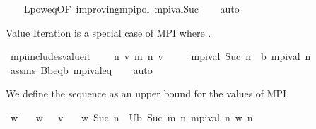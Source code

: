 \begin{isabellebody}
%
\isadelimproof
\ \ %
\endisadelimproof
%
\isatagproof
{}\isamarkupfalse%
\ L{\isacharunderscore}{\kern0pt}pow{\isacharunderscore}{\kern0pt}eq{\isacharbrackleft}{\kern0pt}OF\ {\isasymnu}{\isacharunderscore}{\kern0pt}improving{\isacharunderscore}{\kern0pt}mpi{\isacharunderscore}{\kern0pt}pol{\isacharbrackright}{\kern0pt}\ mpi{\isacharunderscore}{\kern0pt}val{\isacharunderscore}{\kern0pt}Suc\isanewline
\ \ \isamarkupfalse%
\ auto%
\endisatagproof
{\isafoldproof}%
%
\isadelimproof
%
\endisadelimproof
%
\begin{isamarkuptext}%
Value Iteration is a special case of MPI where .%
\end{isamarkuptext}\isamarkuptrue%
\isamarkupfalse%
\ mpi{\isacharunderscore}{\kern0pt}includes{\isacharunderscore}{\kern0pt}value{\isacharunderscore}{\kern0pt}it{\isacharcolon}{\kern0pt}\ \isanewline
\ \ \ {\isachardoublequoteopen}{\isasymforall}n\ v{\isachardot}{\kern0pt}\ m\ n\ v\ {\isacharequal}{\kern0pt}\ {}{\isachardoublequoteclose}\isanewline
\ \ \ {\isachardoublequoteopen}mpi{\isacharunderscore}{\kern0pt}val\ {\isacharparenleft}{\kern0pt}Suc\ n{\isacharparenright}{\kern0pt}\ {\isacharequal}{\kern0pt}\ {\isasymL}\isactrlsub b\ {\isacharparenleft}{\kern0pt}mpi{\isacharunderscore}{\kern0pt}val\ n{\isacharparenright}{\kern0pt}{\isachardoublequoteclose}\isanewline
%
\isadelimproof
\ \ %
\endisadelimproof
%
\isatagproof
{}\isamarkupfalse%
\ assms\ B\isactrlsub b{\isacharunderscore}{\kern0pt}eq{\isacharunderscore}{\kern0pt}{\isasymL}\isactrlsub b\ mpi{\isacharunderscore}{\kern0pt}val{\isacharunderscore}{\kern0pt}eq\isanewline
\ \ \isamarkupfalse%
\ auto%
\endisatagproof
{\isafoldproof}%
%
\isadelimproof
%
\endisadelimproof
%
\isadelimdocument
%
\endisadelimdocument
%
\isatagdocument
%
\isamarkuptrue%
%
\endisatagdocument
{\isafolddocument}%
%
\isadelimdocument
%
\endisadelimdocument
%
\begin{isamarkuptext}%
We define the sequence  as an upper bound for the values of MPI.%
\end{isamarkuptext}\isamarkuptrue%
\isamarkupfalse%
\ w\ \isanewline
\ \ {\isachardoublequoteopen}w\ {}\ {\isacharequal}{\kern0pt}\ v{}{\isachardoublequoteclose}\ {\isacharbar}{\kern0pt}\isanewline
\ \ {\isachardoublequoteopen}w\ {\isacharparenleft}{\kern0pt}Suc\ n{\isacharparenright}{\kern0pt}\ {\isacharequal}{\kern0pt}\ U\isactrlsub b\ {\isacharparenleft}{\kern0pt}Suc\ {\isacharparenleft}{\kern0pt}m\ n\ {\isacharparenleft}{\kern0pt}mpi{\isacharunderscore}{\kern0pt}val\ n{\isacharparenright}{\kern0pt}{\isacharparenright}{\kern0pt}{\isacharparenright}{\kern0pt}\ {\isacharparenleft}{\kern0pt}w\ n{\isacharparenright}{\kern0pt}{\isachardoublequoteclose}\isanewline

\end{isabellebody}
